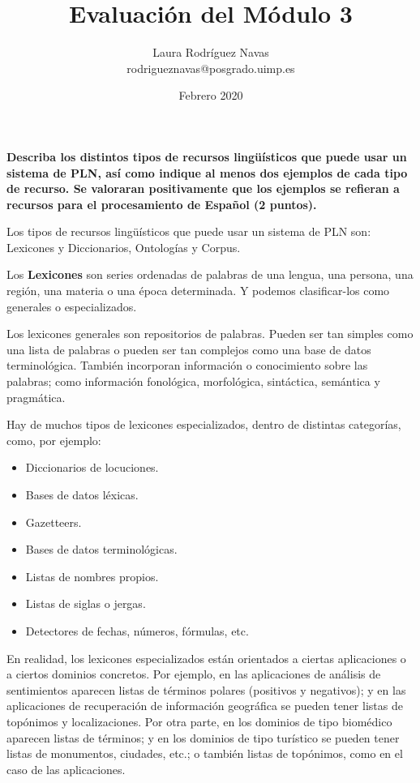 \documentclass[11pt]{exam}
\title{Evaluación del Módulo 3}
\author{Laura Rodríguez Navas \\ rodrigueznavas@posgrado.uimp.es}
\date{Febrero 2020}
\begin{document}
\maketitle

\begin{questions}
	
{\bf \question Describa los distintos tipos de recursos lingüísticos que puede usar un sistema de PLN, así como indique al menos dos ejemplos de cada tipo de recurso. Se valoraran positivamente que los ejemplos se refieran a recursos para el procesamiento de Español (2 puntos).}

Los tipos de recursos lingüísticos que puede usar un sistema de PLN son: Lexicones y Diccionarios, Ontologías y Corpus.

Los {\bf Lexicones} son series ordenadas de palabras de una lengua, una persona, una región, una materia o una época determinada. Y podemos clasificar-los como generales o especializados.

Los lexicones generales son repositorios de palabras. Pueden ser tan simples como una lista de palabras o pueden ser tan complejos como una base de datos terminológica. También incorporan información o conocimiento sobre las palabras; como información fonológica, morfológica, sintáctica, semántica y pragmática.

Hay de muchos tipos de lexicones especializados, dentro de distintas categorías, como, por ejemplo:

\begin{itemize}
	\item Diccionarios de locuciones.
	\item Bases de datos léxicas.
	\item Gazetteers.
	\item Bases de datos terminológicas.
	\item Listas de nombres propios.
	\item Listas de siglas o jergas.
	\item Detectores de fechas, números, fórmulas, etc.
\end{itemize}

En realidad, los lexicones especializados están orientados a ciertas aplicaciones o a ciertos dominios concretos. Por ejemplo, en las aplicaciones de análisis de sentimientos aparecen listas de términos polares (positivos y negativos); y en las aplicaciones de recuperación de información geográfica se pueden tener listas de topónimos y localizaciones. Por otra parte, en los dominios de tipo biomédico aparecen listas de términos; y en los dominios de tipo turístico se pueden tener listas de monumentos, ciudades, etc.; o también listas de topónimos, como en el caso de las aplicaciones.


\end{questions}
\end{document}

